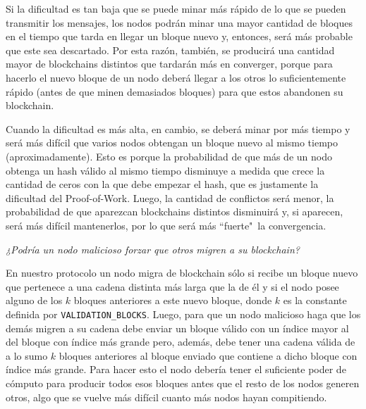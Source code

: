Si la dificultad es tan baja que se puede minar más rápido de lo que se pueden transmitir los mensajes, los nodos podrán minar una mayor cantidad de bloques en el tiempo que tarda en llegar un bloque nuevo y, entonces, será más probable que este sea descartado. Por esta razón, también, se producirá una cantidad mayor de blockchains distintos que tardarán más en converger, porque para hacerlo el nuevo bloque de un nodo deberá llegar a los otros lo suficientemente rápido (antes de que minen demasiados bloques) para que estos abandonen su blockchain.

Cuando la dificultad es más alta, en cambio, se deberá minar por más tiempo y será más difícil que varios nodos obtengan un bloque nuevo al mismo tiempo (aproximadamente). Esto es porque la probabilidad de que más de un nodo obtenga un hash válido al mismo tiempo disminuye a medida que crece la cantidad de ceros con la que debe empezar el hash, que es justamente la dificultad del Proof-of-Work. Luego, la cantidad de conflictos será menor, la probabilidad de que aparezcan blockchains distintos disminuirá y, si aparecen, será más difícil mantenerlos, por lo que será más ``fuerte"\ la convergencia.

\emph{¿Podría un nodo malicioso forzar que otros migren a su blockchain?}

En nuestro protocolo un nodo migra de blockchain sólo si recibe un bloque nuevo que pertenece a una cadena distinta más larga que la de él y si el nodo posee alguno de los $k$ bloques anteriores a este nuevo bloque, donde $k$ es la constante definida por \texttt{VALIDATION\_BLOCKS}. Luego, para que un nodo malicioso haga que los demás migren a su cadena debe enviar un bloque válido con un índice mayor al del bloque con índice más grande pero, además, debe tener una cadena válida de a lo sumo $k$ bloques anteriores al bloque enviado que contiene a dicho bloque con índice más grande. Para hacer esto el nodo debería tener el suficiente poder de cómputo para producir todos esos bloques antes que el resto de los nodos generen otros, algo que se vuelve más difícil cuanto más nodos hayan compitiendo.
